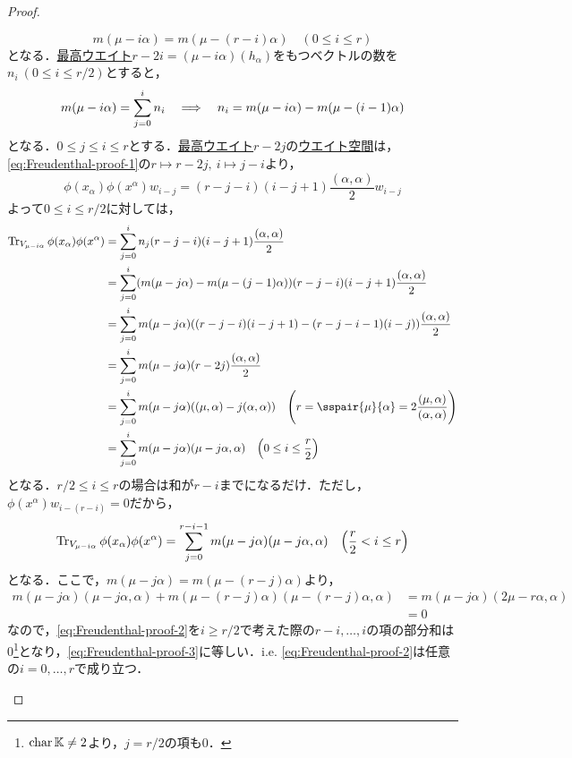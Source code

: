 \documentclass[rep_main]{subfiles}
\begin{document}
\begin{proof}
\begin{description}
		\begin{equation}
			m(\mu - i\alpha) = m(\mu - (r - i)\alpha)\quad  (0 \leq i \leq r)
		\end{equation}
		となる．\hyperref[def:highest-weight-module]{最高ウエイト}$r - 2i = (\mu - i\alpha)(h_\alpha)$をもつベクトルの数を$n_i\ (0 \leq i \leq r/2)$とすると，
		\begin{equation}
			m(\mu - i\alpha) = \sum_{j = 0}^i n_i  \quad \Longrightarrow \quad  n_i = m(\mu - i\alpha) - m(\mu - (i - 1)\alpha)
		\end{equation}
		となる．$0 \leq j \leq i \leq r$とする．\hyperref[def:highest-weight-module]{最高ウエイト}$r - 2j$の\hyperref[def:weight-rep]{ウエイト空間}は，\eqref{eq:Freudenthal-proof-1}の$r \mapsto r - 2j,\ i \mapsto j - i$より，
		\begin{equation}
			\phi(x_\alpha)\phi(x^\alpha)w_{i - j} = (r - j - i)(i - j + 1)\frac{(\alpha, \alpha)}{2}w_{i - j}
		\end{equation}
		よって$0 \leq i \leq r/2$に対しては，
		\begin{align}
			\Tr_{V_{\mu - i\alpha}} \phi(x_\alpha)\phi(x^\alpha) &= \sum_{j = 0}^i n_j(r - j - i)(i - j + 1)\frac{(\alpha, \alpha)}{2} \\
			&= \sum_{j = 0}^i (m(\mu - j\alpha) - m(\mu - (j - 1)\alpha))(r - j - i)(i - j + 1)\frac{(\alpha, \alpha)}{2} \\
			&= \sum_{j = 0}^i m(\mu - j\alpha)((r - j - i)(i - j + 1) - (r - j - i - 1)(i - j))\frac{(\alpha, \alpha)}{2} \\
			&= \sum_{j = 0}^i m(\mu - j\alpha)(r - 2j)\frac{(\alpha, \alpha)}{2} \\
			&= \sum_{j = 0}^i m(\mu - j\alpha)((\mu, \alpha) - j(\alpha, \alpha))\quad  \Biggl(r = \sspair{\mu}{\alpha} = 2\frac{(\mu, \alpha)}{(\alpha, \alpha)}\Biggr) \\
			\label{eq:Freudenthal-proof-2}
			&= \sum_{j=0}^i m(\mu - j\alpha)(\mu - j\alpha, \alpha)\quad  \Bigl(0 \leq i \leq \frac{r}{2}\Bigr)
		\end{align}
		となる．$r/2 \leq i \leq r$の場合は和が$r - i$までになるだけ．ただし，$\phi(x^\alpha)w_{i - (r - i)} = 0$だから，
		\begin{align}
			\label{eq:Freudenthal-proof-3}
			\Tr_{V_{\mu - i\alpha}} \phi(x_\alpha)\phi(x^\alpha) = \sum_{j=0}^{r - i - 1} m(\mu - j\alpha)(\mu - j\alpha, \alpha)\quad  \Bigl(\frac{r}{2} < i \leq r\Bigr)
		\end{align}
		となる．ここで，$m(\mu - j\alpha) = m(\mu - (r - j)\alpha)$より，
		\begin{align}
			m(\mu - j\alpha)(\mu - j\alpha, \alpha) + m(\mu - (r - j)\alpha)(\mu - (r - j)\alpha, \alpha) &= m(\mu - j\alpha)(2\mu - r\alpha, \alpha) \\
			\label{eq:Freudenthal-proof-4}
			&= 0
		\end{align}
		なので，\eqref{eq:Freudenthal-proof-2}を$i \geq r/2$で考えた際の$r - i,\ldots, i$の項の部分和は$0$\footnote{$\operatorname{char}\mathbb{K} \neq 2$より，$j = r/2$の項も$0$．}となり，\eqref{eq:Freudenthal-proof-3}に等しい．i.e. \eqref{eq:Freudenthal-proof-2}は任意の$i = 0, \ldots, r$で成り立つ．
		

\end{description}
\end{proof}
\end{document}
